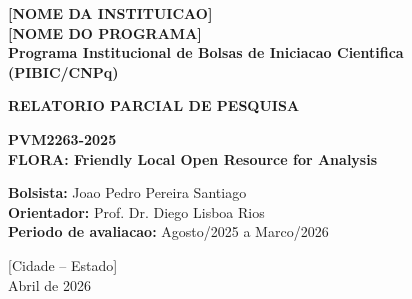 \documentclass[12pt,a4paper]{article}
\begin{document}
\begin{titlepage}
    \begin{center}
        {\large \textbf{[NOME DA INSTITUICAO]}}\\
        {\large \textbf{[NOME DO PROGRAMA]}}\\
        {\large \textbf{Programa Institucional de Bolsas de Iniciacao Cientifica (PIBIC/CNPq)}}\\

        \vspace{4cm}

        {\Large \textbf{RELATORIO PARCIAL DE PESQUISA}}\\

        \vspace{1.8cm}

        {\Large \textbf{PVM2263-2025}}\\
        {\Large \textbf{FLORA: Friendly Local Open Resource for Analysis}}\\

        \vspace{4cm}

        \begin{flushleft}
            \textbf{Bolsista:} Joao Pedro Pereira Santiago\\
            \textbf{Orientador:} Prof. Dr. Diego Lisboa Rios\\
            \textbf{Periodo de avaliacao:} Agosto/2025 a Marco/2026
        \end{flushleft}

        \vfill

        {\large [Cidade -- Estado]}\\
        {\large Abril de 2026}
    \end{center}
\end{titlepage}
\end{document}
